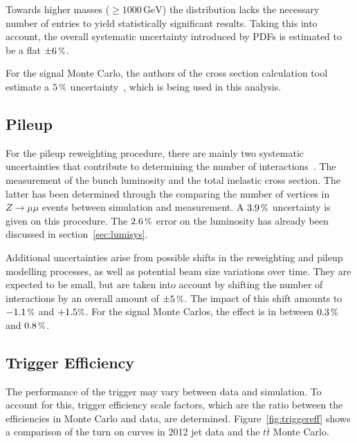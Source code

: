 Towards higher masses ($\geq 1000\,\text{GeV}$) the distribution lacks the necessary number of entries to yield statistically significant results. Taking this into account, the overall systematic uncertainty introduced by PDFs is estimated to be a flat $\pm 6\,\pct$.

For the signal Monte Carlo, the authors of the cross section calculation tool estimate a $5\,\pct$ uncertainty~\cite{susyxstool}, which is being used in this analysis.


\subsection{Pileup}
\label{sec:pusys}

For the pileup reweighting procedure, there are mainly two systematic uncertainties that contribute to determining the number of interactions~\cite{pileupsys}. The measurement of the bunch luminosity and the total inelastic cross section. The latter has been determined through the comparing the number of vertices in $Z \rightarrow \mu\mu$ events between simulation and measurement. A $3.9\,\pct$ uncertainty is given on this procedure. The $2.6\,\pct$ error on the luminosity has already been discussed in section~\ref{sec:lumisys}.

Additional uncertainties arise from possible shifts in the reweighting and pileup modelling processes, as well as potential beam size variations over time. They are expected to be small, but are taken into account by shifting the number of interactions by an overall amount of $\pm 5\,\pct$. The impact of this shift amounts to $-1.1\,\pct$ and $+1.5\pct$. For the signal Monte Carlos, the effect is in between $0.3\,\pct$ and $0.8\,\pct$.


\subsection{Trigger Efficiency}
\label{sec:trig-eff}

The performance of the trigger may vary between data and simulation. To account for this, trigger efficiency scale factors, which are the ratio between the efficiencies in Monte Carlo and data, are determined. Figure~\ref{fig:triggereff} shows a comparison of the turn on curves in 2012 jet data and the $t\bar{t}$ Monte Carlo.


